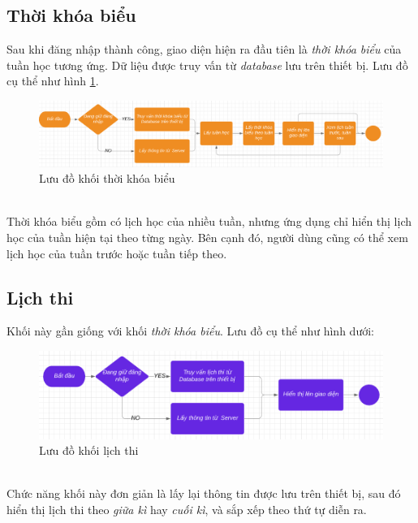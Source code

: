 \documentclass[a4paper]{article}
\begin{document}
\subsection {Thời khóa biểu}
\hspace*{0.5 cm}Sau khi đăng nhập thành công, giao diện hiện ra đầu tiên là \textit{thời khóa biểu} của tuần học tương ứng. Dữ liệu được truy vấn từ \textit{database} lưu trên thiết bị. Lưu đồ cụ thể như hình \ref{fig:scheduler}.\\
\begin{figure}[h!]
    \centering
    \includegraphics[scale=.4]{schedulerflow.png}
    \caption{Lưu đồ khối thời khóa biểu}
    \label{fig:scheduler}
\end{figure}\\
\hspace*{0.5 cm}Thời khóa biểu gồm có lịch học của nhiều tuần, nhưng ứng dụng chỉ hiển thị lịch học của tuần hiện tại theo từng ngày. Bên cạnh đó, người dùng cũng có thể xem lịch học của tuần trước hoặc tuần tiếp theo.
\subsection{Lịch thi}
\hspace*{.5 cm} Khối này gần giống với khối \textit{thời khóa biểu}. Lưu đồ cụ thể như hình dưới:
\begin{figure}[H]
    \centering
    \includegraphics[scale=.4]{exam.png}
    \caption{Lưu đồ khối lịch thi}
\end{figure}\\
\hspace*{0.5 cm}Chức năng khối này đơn giản là lấy lại thông tin được lưu trên thiết bị, sau đó hiển thị lịch thi theo \textit{giữa kì} hay \textit{cuối kì}, và sắp xếp theo thứ tự diễn ra.
\end{document}

